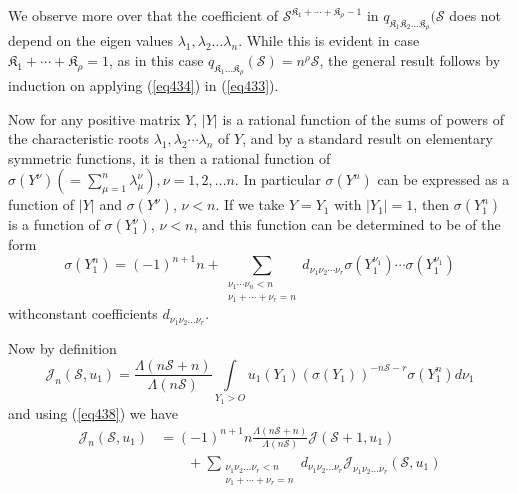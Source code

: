 We observe more over that the coefficient of
$\mathscr{S}^{\mathfrak{K}_1 + \cdots + \mathfrak{K}_\rho -1}$ in\break
$q_{\mathfrak{K}_1\mathfrak{K}_2 \ldots \mathfrak{K}_\rho} (\mathscr{S}$
does not depend on the eigen values $\lambda_1, \lambda_2 \ldots
\lambda_n$. While this is evident in case $\mathfrak{K}_1 + \cdots +
\mathfrak{K}_\rho = 1$, as in this case $q_{\mathfrak{K}_1 \ldots
  \mathfrak{K}_\rho} (\mathscr{S}) = n^{\rho}\mathscr{S}$, the general
result follows by induction on applying (\ref{eq434}) in (\ref{eq433}).  

Now for any positive matrix $Y$, $|Y|$ is a rational function of the
sums of powers of the characteristic roots $\lambda_1, \lambda_2
\cdots \lambda_n$ of $Y$, and by a standard result on elementary
symmetric functions, it is then a rational function of $\sigma (Y^\nu)
( = \sum_{\mu = 1}^n   \lambda^\nu_\mu), \nu = 1,2,\ldots n$. In
particular $\sigma(Y^n)$ can be expressed as a function of $| Y | $
and $\sigma(Y^\nu)$, $\nu < n$. If we take $Y = Y_1$ with $| Y_1 | = 1$,
then $\sigma(Y_1^n)$ is a function of $\sigma(Y^\nu_1)$, $\nu < n$, and
this function can be determined to be of the form 
\begin{equation*}
\sigma(Y^n_1) = (-1)^{n+1}   n  + \sum_{\substack{\nu_1  \cdots \nu_n
    < n \\ \nu_1 + \cdots + \nu_r = n}}   d_{\nu_1\nu_2 \cdots \nu_r}
\sigma(Y^{\nu_1}_{1}) \cdots \sigma(Y^{\nu_1}_1) \tag{438}\label{eq438} 
\end{equation*}
with\pageoriginale constant coefficients $d_{\nu_1\nu_2 \ldots \nu_r}$.

Now by definition
\begin{equation*}
\mathcal{J}_n(\mathscr{S},u_1) = \frac{\Lambda (n\mathscr{S}+
  n)}{\Lambda (n\mathscr{S})} \int\limits_{Y_1 > O}
u_1(Y_1)(\sigma(Y_1))^{-n\mathscr{S}-r} \sigma(Y^n_1)d\nu_1
\tag{439}\label{eq439} 
\end{equation*}
and using (\ref{eq438}) we have 
\begin{align*}
\mathcal{J}_n(\mathscr{S},u_1) & = (-1)^{n+1}   n \frac{\Lambda(n
  \mathscr{S}+n)}{\Lambda{(n\mathscr{S})}} \mathcal{J}(\mathscr{S}+
1,u_1) \\ 
& \qquad + \sum_{\substack{\nu_1\nu_2 \ldots \nu_r < n \\ \nu_1 + \cdots
    + \nu_r=n}}   d_{\nu_1\nu_2 \ldots \nu_r}
\mathcal{J}_{\nu_1\nu_2 \ldots \nu_r} (\mathscr{S},u_1) 
\end{align*}

